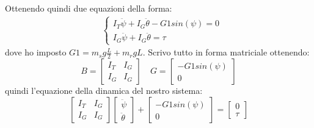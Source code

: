 \documentclass{article}
\begin{document}
Ottenendo quindi due equazioni della forma:
\begin{align}
&
\begin{cases}
I_T\ddot{\psi} + I_G\ddot\theta - G1sin(\psi) = 0\\
I_G\ddot\psi + I_G\ddot\theta = \tau
\end{cases}
\end{align}
dove ho imposto $G1 = m_sg\frac{L}{2}+m_rgL$.
Scrivo tutto in forma matriciale ottenendo:
\[ B =
\begin{bmatrix}
I_T & I_G\\
I_G & I_G
\end{bmatrix}
\quad
G = 
\begin{bmatrix}
-G1sin(\psi)\\
0
\end{bmatrix}
\]
quindi l'equazione della dinamica del nostro sistema:
\begin{equation}
\begin{bmatrix}
I_T & I_G\\
I_G & I_G
\end{bmatrix}
\begin{bmatrix}
\ddot\psi\\
\ddot\theta
\end{bmatrix}
+
\begin{bmatrix}
-G1sin(\psi)\\
0
\end{bmatrix}
=
\begin{bmatrix}
0\\
\tau
\end{bmatrix}
\end{equation}
\end{document}

